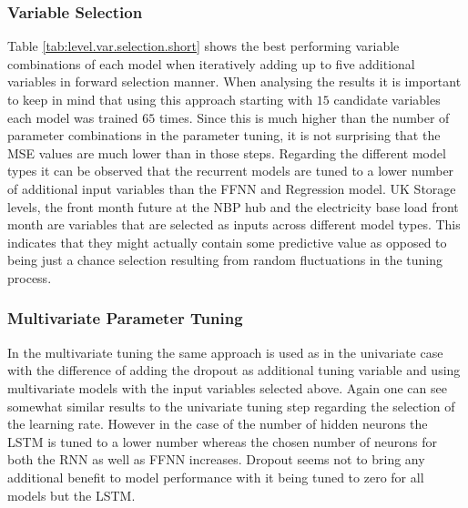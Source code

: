\subsubsection{Variable Selection}
Table \ref{tab:level.var.selection.short} shows the best performing variable combinations of each model when iteratively adding up to five additional variables in forward selection manner. When analysing the results it is important to keep in mind that using this approach starting with $15$ candidate variables each model was trained $65$ times. Since this is much higher than the number of parameter combinations in the parameter tuning, it is not surprising that the MSE values are much lower than in those steps. Regarding the different model types it can be observed that the recurrent models are tuned to a lower number of additional input variables than the FFNN and Regression model. UK Storage levels, the front month future at the NBP hub and the electricity base load front month are variables that are selected as inputs across different model types. This indicates that they might actually contain some predictive value as opposed to being just a chance selection resulting from random fluctuations in the tuning process.

\subsubsection{Multivariate Parameter Tuning}
In the multivariate tuning the same approach is used as in the univariate case with the difference of adding the dropout as additional tuning variable and using multivariate models with the input variables selected above. Again one can see somewhat similar results to the univariate tuning step regarding the selection of the  learning rate. However in the case of the number of hidden neurons the LSTM is tuned to a lower number whereas the chosen number of neurons for both the RNN as well as FFNN increases. Dropout seems not to bring any additional benefit to model performance with it being tuned to zero for all models but the LSTM.


